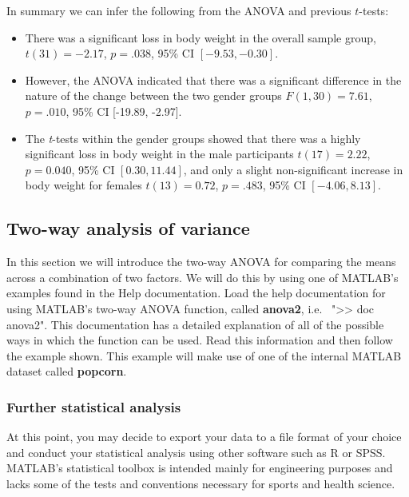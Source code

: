 \documentclass[12pt,a4paper]{article}
\begin{document}
In summary we can infer the following from the ANOVA and previous $t$-tests:

\begin{itemize}
	\item There was a significant loss in body weight in the overall sample group, $t(31) = -2.17$, $p = .038$, 95\% CI $[-9.53, -0.30]$.
	\item However, the ANOVA indicated that there was a significant difference in the nature of the change between the two gender groups $F(1,30) = 7.61$, $p = .010 $, 95\% CI [-19.89, -2.97].
	\item The \emph{t}-tests within the gender groups showed that there was a highly significant loss in body weight in the male participants $t(17) = 2.22$, $p = 0.040$, 95\% CI $[0.30, 11.44]$, and only a slight non-significant increase in body weight for females $t(13) = 0.72$, $p = .483$, 95\% CI $[-4.06, 8.13]$.
\end{itemize}

\subsection{Two-way analysis of variance}
In this section we will introduce the two-way ANOVA for comparing the means across a combination of two factors.  
We will do this by using one of MATLAB's examples found in the Help documentation.  
Load the help documentation for using MATLAB's two-way ANOVA function, called \textbf{anova2}, i.e.~ ">> doc anova2".
This documentation has a detailed explanation of all of the possible ways in which the function can be used.  
Read this information and then follow the example shown.  
This example will make use of one of the internal MATLAB dataset called \textbf{popcorn}.

\subsubsection{Further statistical analysis}
At this point, you may decide to export your data to a file format of your choice and conduct your statistical analysis using other software such as R or SPSS.
MATLAB's statistical toolbox is intended mainly for engineering purposes and lacks some of the tests and conventions necessary for sports and health science.
\end{document}
